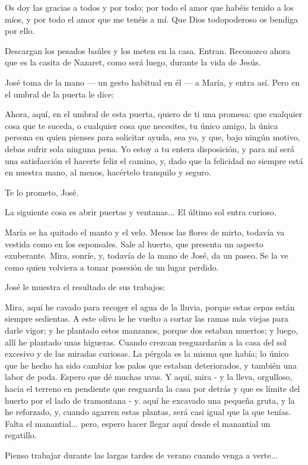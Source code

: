 \documentclass[12pt, twoside, openright]{book} %
\begin{document}
Os doy las gracias a todos y por todo; por todo el amor que habéis tenido a los míos, y por todo el amor que me tenéis a mí. Que Dios todopoderoso os bendiga por ello. 

Descargan los pesados baúles y los meten en la casa. Entran. Reconozco ahora que es la casita de Nazaret, como será luego, durante la vida de Jesús. 

José toma de la mano — un gesto habitual en él — a María, y entra así. Pero en el umbral de la puerta le dice: 

Ahora, aquí, en el umbral de esta puerta, quiero de ti una promesa: que cualquier cosa que te suceda, o cualquier cosa que necesites, tu único amigo, la única persona en quien pienses para solicitar ayuda, sea yo, y que, bajo ningún motivo, debas sufrir sola ninguna pena. Yo estoy a tu entera disposición, y para mí será una satisfacción el hacerte feliz el camino, y, dado que la felicidad no siempre está en nuestra mano, al menos, hacértelo tranquilo y seguro. 

Te lo prometo, José. 

La siguiente cosa es abrir puertas y ventanas... El último sol entra curioso. 

María se ha quitado el manto y el velo. Menos las flores de mirto, todavía va vestida como en los esponsales. Sale al huerto, que presenta un aspecto exuberante. Mira, sonríe, y, todavía de la mano de José, da un paseo. Se la ve como quien volviera a tomar posesión de un lugar perdido. 

José le muestra el resultado de sus trabajos: 

Mira, aquí he cavado para recoger el agua de la lluvia, porque estas cepas están siempre sedientas. A este olivo le he vuelto a cortar las ramas más viejas para darle vigor; y he plantado estos manzanos, porque dos estaban muertos; y luego, allí he plantado unas higueras. Cuando crezcan resguardarán a la casa del sol excesivo y de las miradas curiosas. La pérgola es la misma que había; lo único que he hecho ha sido cambiar los palos que estaban deteriorados, y también una labor de poda. Espero que dé muchas uvas. Y aquí, mira - y la lleva, orgulloso, hacia el terreno en pendiente que resguarda la casa por detrás y que es límite del huerto por el lado de tramontana - y. aquí he excavado una pequeña gruta, y la he reforzado, y, cuando agarren estas plantas, será casi igual que la que tenías. Falta el manantial... pero, espero hacer llegar aquí desde el manantial un regatillo. 

Pienso trabajar durante las largas tardes de verano cuando venga a verte... 
\end{document}
